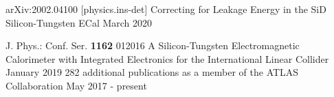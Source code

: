 
\begin{cventries}
\cventry
  {arXiv:2002.04100 [physics.ins-det]}
  {Correcting for Leakage Energy in the SiD Silicon-Tungsten ECal}
  {March 2020}
  {}
  {}

\vspace{-0.4cm}  \cventry
  {J. Phys.: Conf. Ser. \textbf{1162} 012016}
  {A Silicon-Tungsten Electromagnetic Calorimeter with Integrated Electronics for the International Linear Collider}
  {January 2019}
  {}
  {}  
 \vspace{-0.4cm}\cventry
 {}
 {282 additional publications as a member of the ATLAS Collaboration}
 {May 2017 - present}
 {}
 {}
\end{cventries}  

